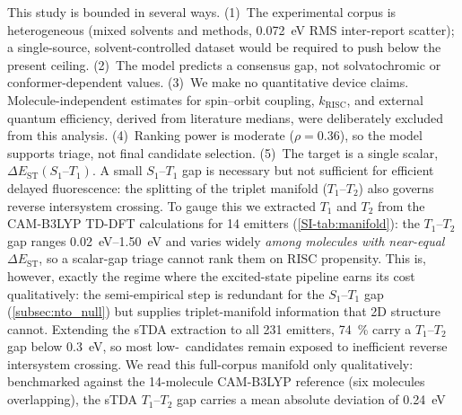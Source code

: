 This study is bounded in several ways.
(1)~The experimental corpus is heterogeneous (mixed solvents and methods,
\qty{0.072}{\electronvolt} RMS inter-report scatter); a single-source,
solvent-controlled dataset would be required to push below the present ceiling.
(2)~The model predicts a consensus gap, not solvatochromic or
conformer-dependent values.
(3)~We make no quantitative device claims.
Molecule-independent estimates for spin–orbit coupling, $k_\text{RISC}$, and external quantum efficiency, derived from literature medians, were deliberately 
excluded from this analysis.
(4)~Ranking power is moderate ($\rho = 0.36$), so the model supports triage, not
final candidate selection.
(5)~The target is a single scalar, $\Delta E_\text{ST}(S_1\text{--}T_1)$. A small
$S_1$--$T_1$ gap is necessary but not sufficient for efficient delayed fluorescence:
the splitting of the triplet manifold ($T_1$--$T_2$) also governs reverse intersystem
crossing.\cite{Keruckiene2024} To gauge this we extracted $T_1$ and $T_2$ from the
CAM-B3LYP TD-DFT calculations for \num{14} emitters (\cref{SI-tab:manifold}): the
$T_1$--$T_2$ gap ranges \qtyrange{0.02}{1.50}{\electronvolt} and varies widely
\emph{among molecules with near-equal $\Delta E_\text{ST}$}, so a scalar-gap triage
cannot rank them on RISC propensity. This is, however, exactly the regime where the
excited-state pipeline earns its cost qualitatively: the semi-empirical step is redundant for the
$S_1$--$T_1$ gap (\cref{subsec:nto_null}) but supplies triplet-manifold information
that 2D structure cannot. Extending the sTDA extraction to all \num{231} emitters,
\qty{74}{\percent} carry a $T_1$--$T_2$ gap below \qty{0.3}{\electronvolt}, so most
low-\deltaest\ candidates remain exposed to inefficient reverse intersystem crossing.
We read this full-corpus manifold only qualitatively: benchmarked against the
\num{14}-molecule CAM-B3LYP reference (six molecules overlapping), the sTDA $T_1$--$T_2$
gap carries a mean absolute deviation of \qty{0.24}{\electronvolt}
